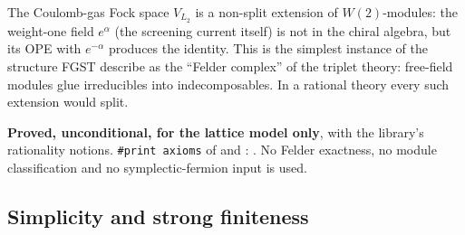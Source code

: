 \begin{physics}
The Coulomb-gas Fock space $V_{L_2}$ is a non-split extension of $W(2)$-modules: the weight-one field
$e^{\alpha}$ (the screening current itself) is not in the chiral algebra, but its OPE with $e^{-\alpha}$
produces the identity. This is the simplest instance of the structure FGST describe as the
``Felder complex'' of the triplet theory: free-field modules glue irreducibles into indecomposables. In a
rational theory every such extension would split.
\end{physics}
\begin{status}
\textbf{Proved, unconditional, for the lattice model only}, with the library's rationality notions. \texttt{\#print axioms} of  and
: . No Felder
exactness, no module classification and no symplectic-fermion input is used.
\end{status}

\subsection{Simplicity and strong finiteness}

